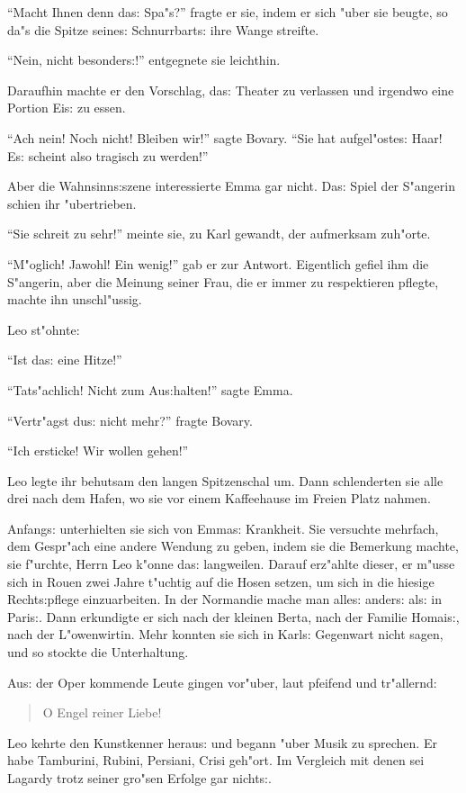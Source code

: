 \documentclass[oneside,12pt]{book}
\newcommand{\s}{s:}%
\begin{document}
"`Macht Ihnen denn da{\s} Spa"s?"' fragte er sie, indem er sich
"uber sie beugte, so da"s die Spitze seine{\s} Schnurrbart{\s}
ihre Wange streifte.

"`Nein, nicht besonder{\s}!"' entgegnete sie leichthin.

Daraufhin machte er den Vorschlag, da{\s} Theater zu verlassen und
irgendwo eine Portion Ei{\s} zu essen.

"`Ach nein! Noch nicht! Bleiben wir!"' sagte Bovary. "`Sie hat
aufgel"oste{\s} Haar! E{\s} scheint also tragisch zu werden!"'

Aber die Wahnsinn{\s}s\/zene interessierte Emma gar nicht. Da{\s}
Spiel der S"angerin schien ihr "ubertrieben.

"`Sie schreit zu sehr!"' meinte sie, zu Karl gewandt, der
aufmerksam zu\-h"orte.

"`M"oglich! Jawohl! Ein wenig!"' gab er zur Antwort. Eigentlich
gefiel ihm die S"angerin, aber die Meinung seiner Frau, die er
immer zu respektieren pflegte, machte ihn unschl"ussig.

Leo st"ohnte:

"`Ist da{\s} eine Hitze!"'

"`Tats"achlich! Nicht zum Au{\s}halten!"' sagte Emma.

"`Vertr"agst du{\s} nicht mehr?"' fragte Bovary.

"`Ich ersticke! Wir wollen gehen!"'

Leo legte ihr behutsam den langen Spitzenschal um. Dann
schlenderten sie alle drei nach dem Hafen, wo sie vor einem
Kaffeehause im Freien Platz nahmen.

Anfang{\s} unterhielten sie sich von Emma{\s} Krankheit. Sie
versuchte mehrfach, dem Gespr"ach eine andere Wendung zu geben,
indem sie die Bemerkung machte, sie f"urchte, Herrn Leo k"onne
da{\s} langweilen. Darauf erz"ahlte dieser, er m"usse sich in
Rouen zwei Jahre t"uchtig auf die Hosen setzen, um sich in die
hiesige Recht{\s}pflege einzuarbeiten. In der Normandie mache man
alle{\s} ander{\s} al{\s} in Pari{\s}. Dann erkundigte er sich
nach der kleinen Berta, nach der Familie Homai{\s}, nach der
L"owenwirtin. Mehr konnten sie sich in Karl{\s} Gegenwart nicht
sagen, und so stockte die Unterhaltung.

Au{\s} der Oper kommende Leute gingen vor"uber, laut pfeifend und
tr"al\-lernd:
\begin{verse}
{\glq}O Engel reiner Liebe!{\grq}
\end{verse}

Leo kehrte den Kunstkenner herau{\s} und begann "uber Musik zu
sprechen. Er habe Tamburini, Rubini, Persiani, Crisi geh"ort. Im
Vergleich mit denen sei Lagardy trotz seiner gro"sen Erfolge gar
nicht{\s}.
\end{document}
